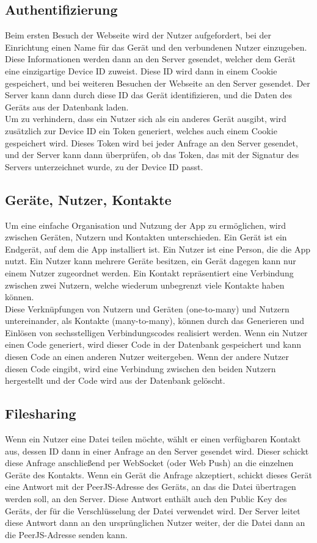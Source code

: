 \documentclass[a4paper]{article}
\begin{document}
\subsection{Authentifizierung}

Beim ersten Besuch der Webseite wird der Nutzer aufgefordert, bei der
Einrichtung einen Name für das Gerät und den verbundenen Nutzer einzugeben.
Diese Informationen werden dann an den Server gesendet, welcher dem Gerät eine
einzigartige Device ID zuweist. Diese ID wird dann in einem Cookie gespeichert,
und bei weiteren Besuchen der Webseite an den Server gesendet. Der Server kann
dann durch diese ID das Gerät identifizieren, und die Daten des Geräts aus der
Datenbank laden.\\
Um zu verhindern, dass ein Nutzer sich als ein anderes Gerät ausgibt, wird
zusätzlich zur Device ID ein Token generiert, welches auch einem Cookie
gespeichert wird. Dieses Token wird bei jeder Anfrage an den Server gesendet,
und der Server kann dann überprüfen, ob das Token, das mit der Signatur des
Servers unterzeichnet wurde, zu der Device ID passt.

\subsection{Geräte, Nutzer, Kontakte}

Um eine einfache Organisation und Nutzung der App zu ermöglichen, wird zwischen Geräten,
Nutzern und Kontakten unterschieden. Ein Gerät ist ein Endgerät, auf dem die App
installiert ist. Ein Nutzer ist eine Person, die die App nutzt. Ein Nutzer kann
mehrere Geräte besitzen, ein Gerät dagegen kann nur einem Nutzer zugeordnet werden. Ein Kontakt repräsentiert
eine Verbindung zwischen zwei Nutzern, welche wiederum unbegrenzt viele Kontakte haben können.\\
Diese Verknüpfungen von Nutzern und Geräten (one-to-many) und Nutzern
untereinander, als Kontakte (many-to-many), können durch das Generieren und
Einlösen von sechsstelligen Verbindungscodes realisiert werden. Wenn ein Nutzer
einen Code generiert, wird dieser Code in der Datenbank gespeichert und kann diesen
Code an einen anderen Nutzer weitergeben. Wenn der andere
Nutzer diesen Code eingibt, wird eine Verbindung zwischen den beiden Nutzern
hergestellt und der Code wird aus der Datenbank gelöscht.


\subsection{Filesharing}
Wenn ein Nutzer eine Datei teilen möchte, wählt er einen verfügbaren Kontakt
aus, dessen ID dann in einer Anfrage an den Server gesendet wird. Dieser schickt
diese Anfrage anschließend per WebSocket (oder Web Push) an die einzelnen Geräte des
Kontakts. Wenn ein Gerät die Anfrage akzeptiert, schickt dieses Gerät eine
Antwort mit der PeerJS-Adresse des Geräts, an das die Datei übertragen werden soll,
an den Server. Diese Antwort enthält auch den Public Key des Geräts, der für die
Verschlüsselung der Datei verwendet wird. Der Server leitet diese Antwort dann
an den ursprünglichen Nutzer weiter, der die Datei dann an die PeerJS-Adresse
senden kann.
\end{document}

